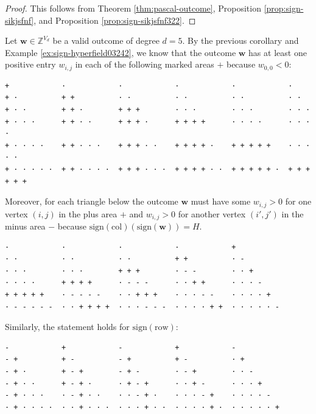 \begin{proof}
    This follows from Theorem \ref{thm:pascal-outcome}, Proposition \ref{prop:sign-sikjsfnf}, and Proposition \ref{prop:sign-sikjsfnf322}.
\end{proof}

\begin{example}\label{ex:sjiu2ui3diag}
    Let \( \mathbf{w} \in \mathbb{Z}^{V_d} \) be a valid outcome of degree \( d = 5 \). By the previous corollary and Example \ref{ex:sign-hyperfield03242}, we know that the outcome \( \mathbf{w} \) has at least one positive entry \( w_{i,j} \) in each of the following marked areas \( + \) because \( w_{0,0} < 0 \):
    \begin{verbatim}
+            ·            ·            ·            ·            ·
+ ·          + +          · ·          · ·          · ·          · ·
+ · ·        + + ·        + + +        · · ·        · · ·        · · ·
+ · · ·      + + · ·      + + + ·      + + + +      · · · ·      · · · ·
+ · · · ·    + + · · ·    + + + · ·    + + + + ·    + + + + +    · · · · ·
+ · · · · ·  + + · · · ·  + + + · · ·  + + + + · ·  + + + + + ·  + + + + + +
    \end{verbatim}
    Moreover, for each triangle below the outcome \( \mathbf{w} \) must have some \( w_{i,j} > 0 \) for one vertex \( (i,j) \) in the plus area \( + \) and \( w_{i,j} > 0 \) for another vertex \( (i',j') \) in the minus area \( - \) because \( \mathrm{sign}(\mathrm{col})(\mathrm{sign}(\mathbf{w})) = H \).
    \begin{verbatim}
·            ·            ·            ·            +
· ·          · ·          · ·          + +          · -
· · ·        · · ·        + + +        · - -        · · +
· · · ·      + + + +      · - - -      · · + +      · · · -
+ + + + +    · - - - -    · · + + +    · · · - -    · · · · +
· - - - - -  · · + + + +  · · · - - -  · · · · + +  · · · · · -
\end{verbatim}
    Similarly, the statement holds for \( \mathrm{sign}(\mathrm{row}) \):
    \begin{verbatim}
-            +            -            +            -
- +          + -          - +          + -          · +
- + ·        + - +        - + -        · - +        · · -
- + · ·      + - + ·      · + - +      · · + -      · · · +
- + · · ·    · - + · ·    · · - + ·    · · · - +    · · · · -
· + · · · ·  · · + · · ·  · · · + · ·  · · · · + ·  · · · · · +
    \end{verbatim}
\end{example}

